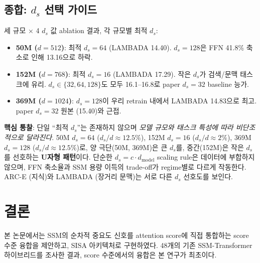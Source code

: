\documentclass[11pt]{article}
\begin{document}
\subsection{종합: $d_s$ 선택 가이드}

세 규모 × 4 $d_s$ 값 ablation 결과, 각 규모별 최적 $d_s$:

\begin{itemize}[leftmargin=*]
\item \textbf{50M ($d = 512$)}: 최적 $d_s = 64$ (LAMBADA 14.40). $d_s = 128$은 FFN 41.8\% 축소로 인해 13.16으로 하락.
\item \textbf{152M ($d = 768$)}: 최적 $d_s = 16$ (LAMBADA 17.29). 작은 $d_s$가 검색/문맥 태스크에 유리. $d_s \in \{32, 64, 128\}$도 모두 16.1--16.8로 paper $d_s = 32$ baseline 능가.
\item \textbf{369M ($d = 1024$)}: $d_s = 128$이 우리 retrain 내에서 LAMBADA 14.83으로 최고. paper $d_s = 32$ 원본 (15.40)와 근접.
\end{itemize}

\textbf{핵심 통찰}: 단일 ``최적 $d_s$''는 존재하지 않으며 \textit{모델 규모와 태스크 특성에 따라 비단조적으로 달라진다}. 50M $d_s=64$ ($d_s/d \approx 12.5\%$), 152M $d_s=16$ ($d_s/d \approx 2\%$), 369M $d_s=128$ ($d_s/d \approx 12.5\%$)로, 양 극단(50M, 369M)은 큰 $d_s$를, 중간(152M)은 작은 $d_s$를 선호하는 \textbf{U자형 패턴}이다. 단순한 $d_s = c \cdot d_{\text{model}}$ scaling rule은 데이터에 부합하지 않으며, FFN 축소율과 SSM 용량 이득의 trade-off가 regime별로 다르게 작동한다. ARC-E (지식)와 LAMBADA (장거리 문맥)는 서로 다른 $d_s$ 선호도를 보인다.

\section{결론}

본 논문에서는 SSM의 순차적 중요도 신호를 attention score에 직접 통합하는 score 수준 융합을 제안하고, SISA 아키텍처로 구현하였다. 48개의 기존 SSM-Transformer 하이브리드를 조사한 결과, score 수준에서의 융합은 본 연구가 최초이다.
\end{document}
